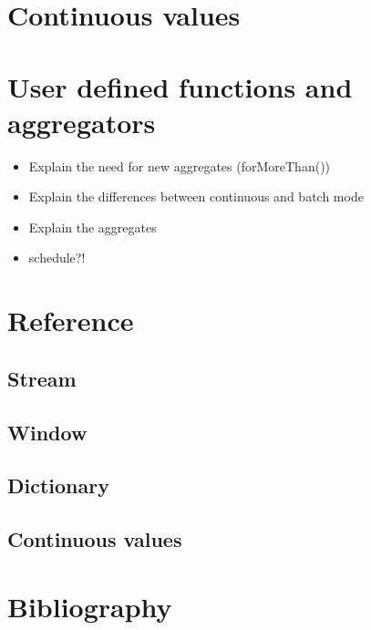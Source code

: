 \documentclass{report}
\begin{document}
\chapter{Continuous values}

\chapter{User defined functions and aggregators}
\begin{itemize}
\item Explain the need for new aggregates (forMoreThan())
\item Explain the differences between continuous and batch mode
\item Explain the aggregates
\item schedule?!
\end{itemize}
\chapter{Reference}

\section{Stream}

\section{Window}

\section{Dictionary}

\section{Continuous values}

\chapter{Bibliography}
\end{document}
